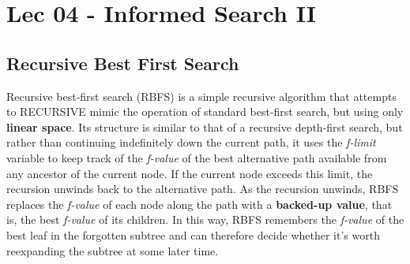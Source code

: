 \chapter{Lec 04 - Informed Search II}
\section{Recursive Best First Search}
Recursive best-first search (RBFS) is a simple recursive algorithm that attempts to RECURSIVE mimic the operation of standard best-first search, but using only \textbf{linear space}.\newline\newline
Its structure is similar to that of a recursive depth-first search, but
rather than continuing indefinitely down the current path, it uses the \textit{f-limit} variable to keep track of the \textit{f-value} of the best alternative path available from any ancestor of the current node. If the current node exceeds this limit, the recursion unwinds back to the alternative path. As the recursion unwinds, RBFS replaces the \textit{f-value} of each node along the path with a \textbf{backed-up value}, that is, the best \textit{f-value} of its children. In this way, RBFS remembers the \textit{f-value} of the best leaf in the forgotten subtree and can therefore decide whether it’s worth reexpanding the subtree at some later time.

